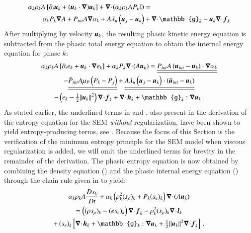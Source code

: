 %
\begin{align}\label{eq:vel-7-eqn-model-sect4}
\alpha_k \rho_k  A \left[ \partial_t \mbold u_k + (\mbold u_k \cdot \grad) \mbold u_k \right]  + \div \left( \alpha_k \rho_k A P_k \mathbb{I} \right) &=\nonumber\\
\alpha_k P_k \grad A + P_{int} A \grad \alpha_k + A \lambda_u \left( \mbold u_j - \mbold u_k \right) &+ \div \mathbb{g}_k - \mbold u_k \div \mbold f_k
\end{align}
%
After multiplying  by velocity $\boldsymbol u_k$, the resulting phasic kinetic energy equation is subtracted 
from the phasic total energy equation to obtain the internal energy equation for phase $k$:
%
\begin{multline}\label{eq:int-ener-7-eqn-model-sect4}
\alpha_k \rho_k  A \left[ \partial_t  e_k + \mbold u_k \cdot \grad  e_k \right]  
+ \alpha_k P_k \div (A \mbold u_k ) =
  \underline{\underline{P_{int} A \left(\mbold u_{int}-\mbold u_k \right) \cdot \grad \alpha_k}}  \\
- \underline{\underline{\bar{P}_{int} A \mu_P \left(P_k-P_j \right)}} 
+ \underline{\underline{A \lambda_u \left(\mbold u_j-\mbold u_k  \right) \cdot \left(\bar{\mbold u}_{int}- \mbold u_k \right)}}\\
-\left( e_k -  \tfrac{1}{2} \| \mbold u_k \|^2 \right) \div \mbold f_k 
+ \div \mbold h_k + \mathbb{g}_k : \grad \mbold u_k \,.
\end{multline}
%
As stated earlier, the underlined terms in  and , also present in the derivation of 
the entropy equation for the SEM \emph{without} regularization, have been shown to yield entropy-producing terms, see . 
Because the focus of this Section is the verification of the minimum entropy principle for the SEM model when viscous regularization is added, 
we will omit the underlined terms for brevity in the remainder of the derivation. 
%
The phasic entropy equation is now obtained by combining the density equation () and the phasic 
internal energy equation () through the chain rule given in  to yield:
%
\begin{multline}\label{eq:ent-res-7-eqn-diss-terms}
\alpha_k \rho_k A \frac{Ds_k}{Dt} 
+ \alpha_k \left(  \rho^2_k  (s_\rho)_k + P_k (s_e)_k  \right) \div (A \mbold u_k )  \\
=  \left( (\rho s_\rho)_k - (e s_e)_k \right) \div \mbold f_k 
- \rho^2_k (s_\rho)_k \div \mbold l_k  \\
+ \left(s_e\right)_k \left[ \div \mbold h_k + \mathbb{g}_k : \grad \mbold u_k +  \tfrac{1}{2} \| \mbold u_k \|^2 \div \mbold f_k \right]
\,.
\end{multline}
